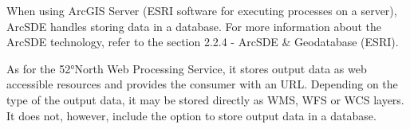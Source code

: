 When using ArcGIS Server (ESRI software for executing processes on a
server), ArcSDE handles storing data in a database. For more
information about the ArcSDE technology, refer to the section 2.2.4 -
ArcSDE \& Geodatabase (ESRI).

As for the 52°North Web Processing Service, it stores output data as
web accessible resources and provides the consumer with an
URL. Depending on the type of the output data, it may be stored
directly as WMS, WFS or WCS layers.\cite{north} It does not, however,
include the option to store output data in a database.
